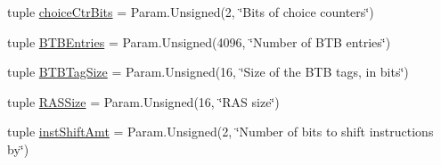 \begin{DoxyCompactItemize}
tuple \hyperlink{classBranchPredictor_1_1BranchPredictor_ae5455b064804378b4ec6f8094452896d}{choiceCtrBits} = Param.Unsigned(2, \char`\"{}Bits of choice counters\char`\"{})
\item 
tuple \hyperlink{classBranchPredictor_1_1BranchPredictor_af08b7bde310be401d556775d6f7022c8}{BTBEntries} = Param.Unsigned(4096, \char`\"{}Number of BTB entries\char`\"{})
\item 
tuple \hyperlink{classBranchPredictor_1_1BranchPredictor_ad8cca86a44213bc6d3bd04b3447079d8}{BTBTagSize} = Param.Unsigned(16, \char`\"{}Size of the BTB tags, in bits\char`\"{})
\item 
tuple \hyperlink{classBranchPredictor_1_1BranchPredictor_ad32cfe43a618dca49f7aba3c597df196}{RASSize} = Param.Unsigned(16, \char`\"{}RAS size\char`\"{})
\item 
tuple \hyperlink{classBranchPredictor_1_1BranchPredictor_a04bfc27685a42245093252b2fab219a5}{instShiftAmt} = Param.Unsigned(2, \char`\"{}Number of bits to shift instructions by\char`\"{})
\end{DoxyCompactItemize}


